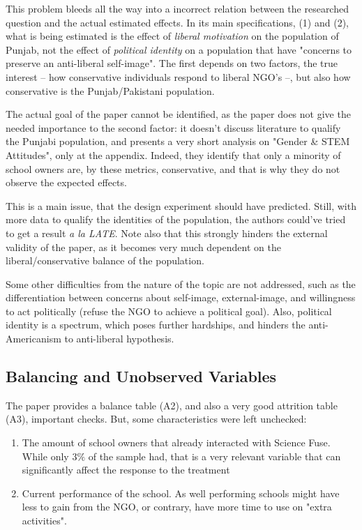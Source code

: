\documentclass[12pt]{article}
\begin{document}
This problem bleeds all the way into a incorrect relation between the researched question and the actual estimated effects. In its main specifications, (1) and (2), what is being estimated is the effect of \textit{liberal motivation} on the population of Punjab, not the effect of \textit{political identity} on a population that have "concerns to preserve an anti-liberal self-image". The first depends on two factors, the true interest -- how conservative individuals respond to liberal NGO's --, but also how conservative is the Punjab/Pakistani population.

The actual goal of the paper cannot be identified, as the paper does not give the needed importance to the second factor: it doesn't discuss literature to qualify the Punjabi population, and presents a very short analysis on "Gender \& STEM Attitudes", only at the appendix. Indeed, they identify that only a minority of school owners are, by these metrics, conservative, and that is why they do not observe the expected effects.

This is a main issue, that the design experiment should have predicted. Still, with more data to qualify the identities of the population, the authors could've tried to get a result \textit{a la LATE}. Note also that this strongly hinders the external validity of the paper, as it becomes very much dependent on the liberal/conservative balance of the population.

Some other difficulties from the nature of the topic are not addressed, such as the differentiation between concerns about self-image, external-image, and willingness to act politically (refuse the NGO to achieve a political goal). Also, political identity is a spectrum, which poses further hardships, and hinders the anti-Americanism to anti-liberal hypothesis.


\subsection{Balancing and Unobserved Variables}

The paper provides a balance table (A2), and also a very good attrition table (A3), important checks. But, some characteristics were left unchecked:

\begin{enumerate}
    \item The amount of school owners that already interacted with Science Fuse. While only $3\%$ of the sample had, that is a very relevant variable that can significantly affect the response to the treatment
    \item Current performance of the school. As well performing schools might have less to gain from the NGO, or contrary, have more time to use on "extra activities". 
\end{enumerate}
\end{document}
